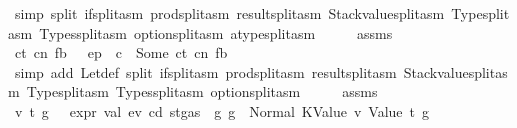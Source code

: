 \begin{isabellebody}
\ {\isacharparenleft}{\kern0pt}simp\ split{\isacharcolon}{\kern0pt}\ if{\isacharunderscore}{\kern0pt}split{\isacharunderscore}{\kern0pt}asm\ prod{\isachardot}{\kern0pt}split{\isacharunderscore}{\kern0pt}asm\ result{\isachardot}{\kern0pt}split{\isacharunderscore}{\kern0pt}asm\ Stackvalue{\isachardot}{\kern0pt}split{\isacharunderscore}{\kern0pt}asm\ Type{\isachardot}{\kern0pt}split{\isacharunderscore}{\kern0pt}asm\ Types{\isachardot}{\kern0pt}split{\isacharunderscore}{\kern0pt}asm\ option{\isachardot}{\kern0pt}split{\isacharunderscore}{\kern0pt}asm\ atype{\isachardot}{\kern0pt}split{\isacharunderscore}{\kern0pt}asm{\isacharparenright}{\kern0pt}\isanewline
\ \ \isamarkupfalse%
\ \isamarkupfalse%
\ assms\ {}\ {}\ {}\ \isamarkupfalse%
\ ct\ cn\ fb{\isacharprime}{\kern0pt}\ \ {}{\isacharcolon}{\kern0pt}\ {\isachardoublequoteopen}ep\ {\isachardollar}{\kern0pt}{\isachardollar}{\kern0pt}\ c\ {\isacharequal}{\kern0pt}\ Some\ {\isacharparenleft}{\kern0pt}ct{\isacharcomma}{\kern0pt}\ cn{\isacharcomma}{\kern0pt}\ fb{\isacharprime}{\kern0pt}{\isacharparenright}{\kern0pt}{\isachardoublequoteclose}\ \isamarkupfalse%
\ {\isacharparenleft}{\kern0pt}simp\ add{\isacharcolon}{\kern0pt}\ Let{\isacharunderscore}{\kern0pt}def\ split{\isacharcolon}{\kern0pt}\ if{\isacharunderscore}{\kern0pt}split{\isacharunderscore}{\kern0pt}asm\ prod{\isachardot}{\kern0pt}split{\isacharunderscore}{\kern0pt}asm\ result{\isachardot}{\kern0pt}split{\isacharunderscore}{\kern0pt}asm\ Stackvalue{\isachardot}{\kern0pt}split{\isacharunderscore}{\kern0pt}asm\ Type{\isachardot}{\kern0pt}split{\isacharunderscore}{\kern0pt}asm\ Types{\isachardot}{\kern0pt}split{\isacharunderscore}{\kern0pt}asm\ option{\isachardot}{\kern0pt}split{\isacharunderscore}{\kern0pt}asm{\isacharparenright}{\kern0pt}\isanewline
\ \ \isamarkupfalse%
\ \isamarkupfalse%
\ assms\ {}\ {}\ {}\ {}\ \isamarkupfalse%
\ v\ t\ g{\isacharprime}{\kern0pt}\ \ {}{\isacharcolon}{\kern0pt}\ {\isachardoublequoteopen}expr\ val\ ev\ cd\ {\isacharparenleft}{\kern0pt}st{\isasymlparr}gas\ {\isacharcolon}{\kern0pt}{\isacharequal}{\kern0pt}\ g{\isasymrparr}{\isacharparenright}{\kern0pt}\ g\ {\isacharequal}{\kern0pt}\ Normal\ {\isacharparenleft}{\kern0pt}{\isacharparenleft}{\kern0pt}KValue\ v{\isacharcomma}{\kern0pt}\ Value\ t{\isacharparenright}{\kern0pt}{\isacharcomma}{\kern0pt}\ g{\isacharprime}{\kern0pt}{\isacharparenright}{\kern0pt}{\isachardoublequoteclose}\ \isamarkupfalse%

\end{isabellebody}
